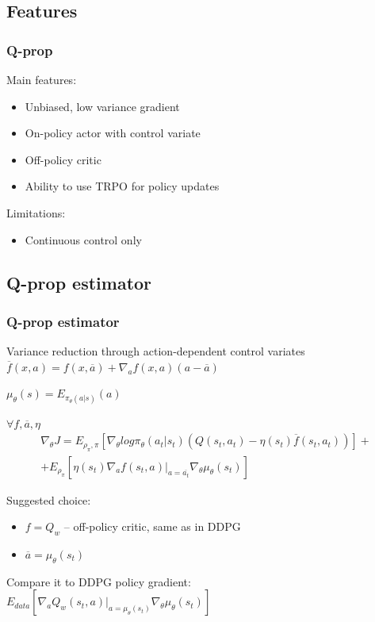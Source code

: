 \documentclass{beamer}
\begin{document}
\subsection{Features}

\begin{frame}[t]
\frametitle{Q-prop}

Main features:
\begin{itemize}
\item Unbiased, low variance gradient
\item On-policy actor with control variate
\item Off-policy critic
\item Ability to use TRPO for policy updates
\end{itemize}

\vspace{4mm}
Limitations:
\begin{itemize}
\item Continuous control only
\end{itemize}

\end{frame}

\subsection{Q-prop estimator}
\begin{frame}[t]
\frametitle{Q-prop estimator}
Variance reduction through action-dependent control variates\\
 
$\overline{f} (x,a) = f(x,\overline{a}) + \nabla_a f(x, a) (a - \overline{a})$

$\mu_\theta(s) = E_{\pi_\theta(a|s)} (a)$

\begin{theorem}
$\forall f, \overline{a}, \eta$
\begin{multline}
\nabla_{\theta} J = E_{\rho_\pi, \pi} \left[ \nabla_{\theta} log \pi_\theta ( a_t | s_t) (Q(s_t, a_t) - \eta(s_t) \overline{f} (s_t,a_t)) \right] + \\ + E_{\rho_\pi} \left[ \eta(s_t) \nabla_a f(s_t, a) |_{a=\overline{a_t}} 
\nabla_\theta \mu_\theta(s_t)
\right]
\end{multline} 
\end{theorem}

Suggested choice: 
\begin{itemize}
\item $f = Q_w$ -- off-policy critic, same as in DDPG
\item $\overline{a} = \mu_\theta(s_t)$
\end{itemize}

Compare it to DDPG policy gradient:
\\$E_{data} \left[ \nabla_a Q_w (s_t, a) |_{a=\mu_\theta(s_t)} 
\nabla_\theta \mu_\theta(s_t) \right]$

\end{frame}
\end{document}

